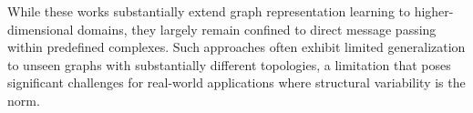 While these works substantially extend graph representation learning to higher-dimensional domains, they largely remain confined to direct message passing within predefined complexes. Such approaches often exhibit limited generalization to unseen graphs with substantially different topologies, a limitation that poses significant challenges for real-world applications where structural variability is the norm. %